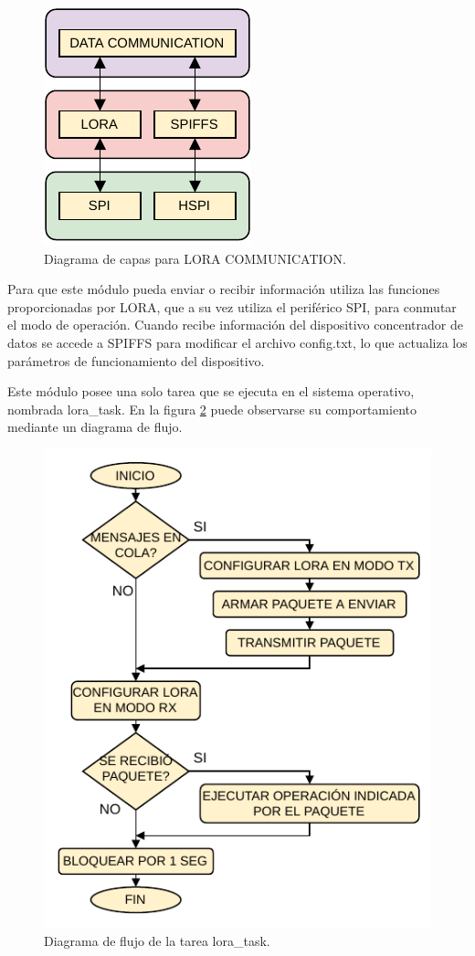 \begin{figure}[h]
	\centering
	\includegraphics[scale=1]{./Figures/lora_communication_diagram.pdf}
	\caption{Diagrama de capas para LORA COMMUNICATION.}
		\label{fig:loraDiagram}
\end{figure}

Para que este módulo pueda enviar o recibir información utiliza las funciones proporcionadas por LORA, que a su vez utiliza el periférico SPI, para conmutar el modo de operación. Cuando recibe información del dispositivo concentrador de datos se accede a SPIFFS para modificar el archivo config.txt, lo que actualiza los parámetros de funcionamiento del dispositivo.

Este módulo posee una solo tarea que se ejecuta en el sistema operativo, nombrada lora\_task. En la figura \ref{fig:loraTask} puede observarse su comportamiento mediante un diagrama de flujo.

\begin{figure}[h]
	\centering
	\includegraphics[scale=1]{./Figures/lora_communication_task.pdf}
	\caption{Diagrama de flujo de la tarea lora\_task.}
		\label{fig:loraTask}
\end{figure}

